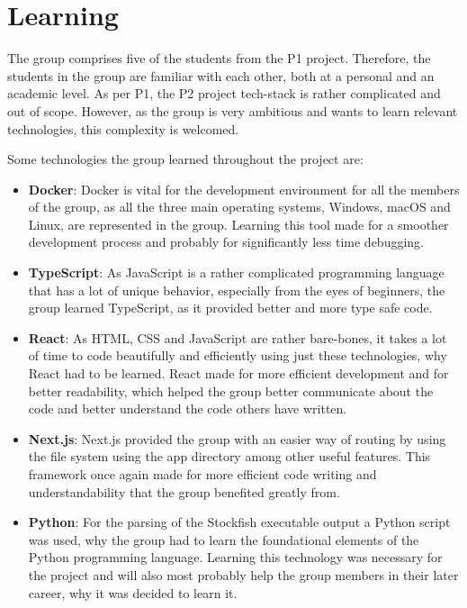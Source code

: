 \section{Learning}\label{sec:learning}

The group comprises five of the students from the P1 project.
Therefore, the students in the group are familiar with each other, both at a personal and an academic level.
As per P1, the P2 project tech-stack is rather complicated and out of scope.
However, as the group is very ambitious and wants to learn relevant technologies, this complexity is welcomed.

Some technologies the group learned throughout the project are:

\begin{itemize}
    \item \textbf{Docker}: Docker is vital for the development environment for all the members of the group, as all the
    three main operating systems, Windows, macOS and Linux, are represented in the group.
    Learning this tool made for a smoother development process and probably for significantly less time debugging.
    \item \textbf{TypeScript}: As JavaScript is a rather complicated programming language that has a lot of unique
    behavior, especially from the eyes of beginners, the group learned TypeScript, as it provided better and more
    type safe code.
    \item \textbf{React}: As HTML, CSS and JavaScript are rather bare-bones, it takes a lot of time to code beautifully
    and efficiently using just these technologies, why React had to be learned.
    React made for more efficient development and for better readability, which helped the group better communicate
    about the code and better understand the code others have written.
    \item \textbf{Next.js}: Next.js provided the group with an easier way of routing by using the file system using the
    app directory among other useful features.
    This framework once again made for more efficient code writing and understandability that the group benefited
    greatly from.
    \item \textbf{Python}: For the parsing of the Stockfish executable output a Python script was used, why the group
    had to learn the foundational elements of the Python programming language.
    Learning this technology was necessary for the project and will also most probably help the group members in their
    later career, why it was decided to learn it.
\end{itemize}
